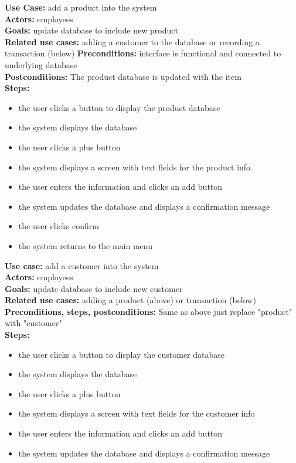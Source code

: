 \documentclass[notitlepage, 11pt]{report}
\begin{document}
\begin{enumerate}[itemindent=-1.5em]
	\textbf{Use Case:} add a product into the system\\
	\textbf{Actors:} employees\\
	\textbf{Goals:} update database to include new product\\
	\textbf{Related use cases:} adding a customer to the database or recording a transaction (below)
	\textbf{Preconditions:} interface is functional and connected to underlying database\\
	\textbf{Postconditions:} The product database is updated with the item\\
	\textbf{Steps:}
		\begin{itemize}
		\item the user clicks a button to display the product database
		\item the system displays the database
		\item the user clicks a plus button 
		\item the system displays a screen with text fields for the product info
		\item the user enters the information and clicks an add button
		\item the system updates the database and displays a confirmation message
		\item the user clicks confirm 
		\item the system returns to the main menu
		\end{itemize}
	\textbf{Use case:} add a customer into the system\\
	\textbf{Actors:} employees\\
	\textbf{Goals:} update database to include new customer\\
	\textbf{Related use cases:} adding a product (above) or transaction (below)\\
	\textbf{Preconditions, steps, postconditions:} Same as above just replace "product" with "customer"\\
		\textbf{Steps:}
		\begin{itemize}
		\item the user clicks a button to display the customer database
		\item the system displays the database
		\item the user clicks a plus button 
		\item the system displays a screen with text fields for the customer info
		\item the user enters the information and clicks an add button
		\item the system updates the database and displays a confirmation message

\end{itemize}
\end{enumerate}
\end{document}
